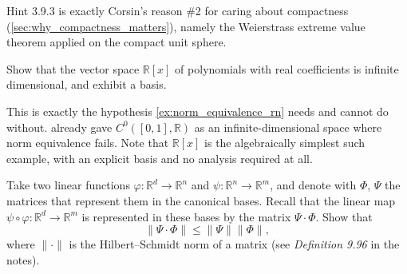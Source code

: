 \begin{remark}
Hint 3.9.3 is exactly Corsin's reason \#2 for caring about compactness
(\cref{sec:why_compactness_matters}), namely the Weierstrass extreme value theorem applied on the
compact unit sphere.
\end{remark}

\begin{exercise}
\label{ex:polynomials_infinite_dimensional}
Show that the vector space $\mathbb{R}[x]$ of polynomials with real coefficients is infinite
dimensional, and exhibit a basis.
\end{exercise}

\begin{remark}
This is exactly the hypothesis \cref{ex:norm_equivalence_rn} needs and cannot do without.
 already gave $C^0([0,1],\mathbb{R})$ as an
infinite-dimensional space where norm equivalence fails. Note that $\mathbb{R}[x]$ is the
algebraically simplest such example, with an explicit basis and no analysis required at all.
\end{remark}


\begin{exercise}
\label{ex:hilbert_schmidt_submultiplicative}
Take two linear functions $\varphi : \mathbb{R}^d \to \mathbb{R}^n$ and
$\psi : \mathbb{R}^n \to \mathbb{R}^m$, and denote with $\Phi$, $\Psi$ the matrices that represent
them in the canonical bases. Recall that the linear map
$\psi \circ \varphi : \mathbb{R}^d \to \mathbb{R}^m$ is represented in these bases by the matrix
$\Psi \cdot \Phi$. Show that
$$\|\Psi \cdot \Phi\| \leq \|\Psi\|\|\Phi\|,$$
where $\|\cdot\|$ is the Hilbert--Schmidt norm of a matrix (see \textit{Definition 9.96} in the
notes).

\end{exercise}

